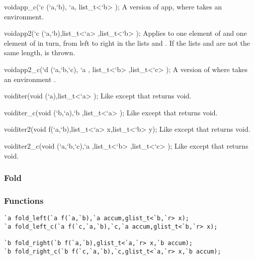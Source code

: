 \begin{defun2}{void}{app_c}{(`c (`a,`b), `a, list_t<`b> );}
  A version of app, where  takes an environment.
\end{defun2}

\begin{defun2}{void}{app2}{(`c (`a,`b),list_t<`a> ,list_t<`b> );}
  Applies  to one element of  and one element of
   in turn, from left to right in the lists  and
  .  If the lists  and  are not the same
  length,  is thrown.
\end{defun2}

\begin{defun2}{void}{app2_c}{(`d (`a,`b,`c), `a , list_t<`b> ,list_t<`c> );}
  A version of  where  takes an environment
  .
\end{defun2}

\begin{defun2}{void}{iter}{(void (`a),list_t<`a> );}
  Like  except that  returns void.
\end{defun2}

\begin{defun2}{void}{iter_c}{(void (`b,`a),`b ,list_t<`a> );}
  Like  except that 
  returns void.
\end{defun2}

\begin{defun2}{void}{iter2}{(void f(`a,`b),list_t<`a> x,list_t<`b> y);}
  Like  except that 
  returns void.
\end{defun2}

\begin{defun2}{void}{iter2_c}{(void (`a,`b,`c),`a ,list_t<`b> ,list_t<`c> );}
  Like  except that
   returns void.
\end{defun2}

\subsubsection*{Fold}
\subsubsection*{Functions}
\begin{verbatim}
`a fold_left(`a f(`a,`b),`a accum,glist_t<`b,`r> x);
`a fold_left_c(`a f(`c,`a,`b),`c,`a accum,glist_t<`b,`r> x);

`b fold_right(`b f(`a,`b),glist_t<`a,`r> x,`b accum);
`b fold_right_c(`b f(`c,`a,`b),`c,glist_t<`a,`r> x,`b accum);
\end{verbatim}

